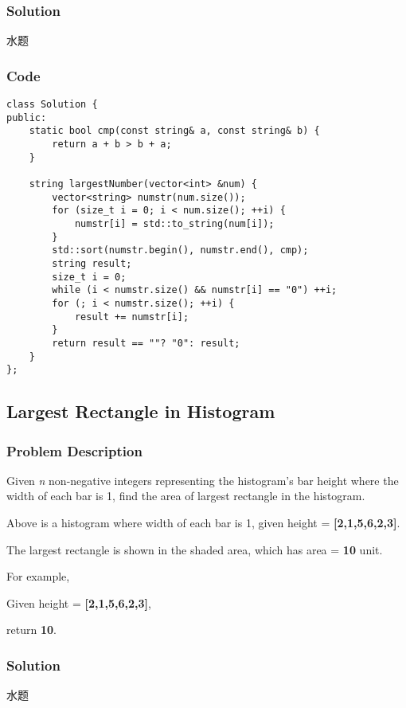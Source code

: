 \documentclass[courier]{article}
\begin{document}
\begin{CJK*}{UTF8}{gkai}
\subsubsection*{Solution}
水题

\subsubsection*{Code}
\begin{lstlisting}
class Solution {
public:
    static bool cmp(const string& a, const string& b) {
        return a + b > b + a;
    }
    
    string largestNumber(vector<int> &num) {
        vector<string> numstr(num.size());
        for (size_t i = 0; i < num.size(); ++i) {
            numstr[i] = std::to_string(num[i]);
        }
        std::sort(numstr.begin(), numstr.end(), cmp);
        string result;
        size_t i = 0;
        while (i < numstr.size() && numstr[i] == "0") ++i;
        for (; i < numstr.size(); ++i) {
            result += numstr[i];
        }
        return result == ""? "0": result;
    }
};

\end{lstlisting}


\subsection{ Largest Rectangle in Histogram }

\subsubsection*{Problem Description}
Given \emph{n} non-negative integers representing the histogram's bar height where the width of each bar is 1, find the area of largest rectangle in the histogram.

Above is a histogram where width of each bar is 1, given height = \textbf{[2,1,5,6,2,3]}.

The largest rectangle is shown in the shaded area, which has area = \textbf{10} unit.

For example,


Given height = \textbf{[2,1,5,6,2,3]},


return \textbf{10}.



\subsubsection*{Solution}
水题


\end{CJK*}
\end{document}
